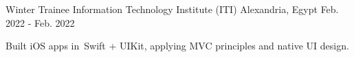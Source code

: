 \begin{cventries}
    \cventry
    {Winter Trainee} %
    {Information Technology Institute (ITI)} %
    {Alexandria, Egypt} %
    {Feb. 2022 - Feb. 2022} %
    {
      \begin{cvitems} %
        \item {Built iOS apps in Swift + UIKit, applying MVC principles and native UI design.}
      \end{cvitems}
    }
    
   
\end{cventries}
